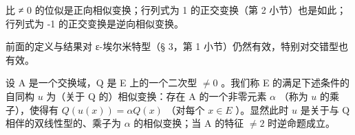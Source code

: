 比 ≠ 0 的位似是正向相似变换；行列式为 1 的正交变换（第 2 小节）也是如此；行列式为 -1 的正交变换是逆向相似变换。

前面的定义与结果对 ε-埃尔米特型（§ 3，第 1 小节）仍然有效，特别对交错型也有效。

设 A 是一个交换域，Q 是 E 上的一个二次型 \(\neq 0\) 。我们称 E 的满足下述条件的自同构 \(u\) 为（关于 Q 的）相似变换：存在 A 的一个非零元素 \(\alpha\) （称为 \(u\) 的乘子），使得有 \(Q(u(x)) = \alpha Q(x)\) （对每个 \(x \in E\) ）。显然此时 \(u\) 是关于与 Q 相伴的双线性型的、乘子为 \(\alpha\) 的相似变换；当 A 的特征 \(\neq 2\) 时逆命题成立。
\relax{}
